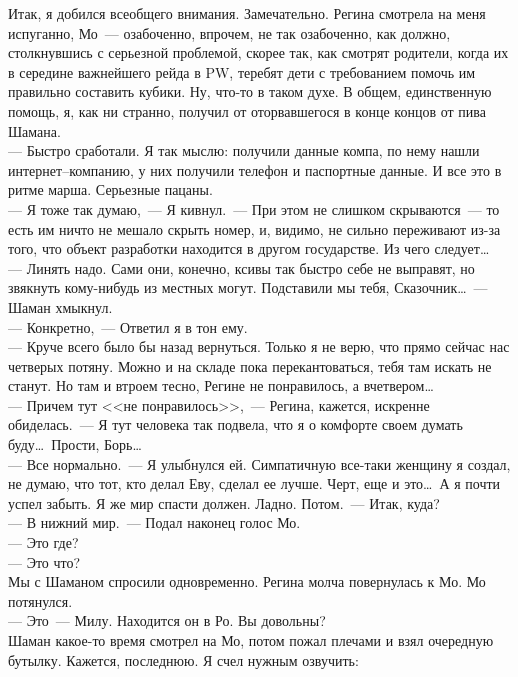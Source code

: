 Итак, я добился всеобщего внимания. Замечательно. Регина смотрела на меня 
испуганно, Мо~--- озабоченно, впрочем, не так озабоченно, как должно, 
столкнувшись с серьезной проблемой, скорее так, как смотрят родители, когда их в середине 
важнейшего рейда в PW, теребят дети с требованием помочь им правильно составить 
кубики. Ну, что-то в таком духе. В общем, единственную помощь, я, как ни 
странно, получил от оторвавшегося в конце концов от пива Шамана.\\
--- Быстро сработали. Я так мыслю: получили данные компа, по нему нашли 
интернет--компанию, у них получили телефон и паспортные данные. И все это в 
ритме марша. Серьезные пацаны. \\
--- Я тоже так думаю,~--- Я кивнул.~--- При этом не слишком скрываются~--- то 
есть им ничто не мешало скрыть номер, и, видимо, не сильно переживают из-за того, что 
объект разработки находится в другом государстве. Из чего следует\ldots\\
--- Линять надо. Сами они, конечно, ксивы так быстро себе не выправят, но 
звякнуть кому-нибудь из местных могут. Подставили мы тебя, Сказочник\ldots~--- Шаман хмыкнул.\\
--- Конкретно,~--- Ответил я в тон ему.\\
--- Круче всего было бы назад вернуться. Только я не верю, что прямо сейчас нас 
четверых потяну. Можно и на складе пока перекантоваться, тебя там искать не 
станут. Но там и втроем тесно, Регине не понравилось, а вчетвером\ldots\\
--- Причем тут <<не понравилось>>,~--- Регина, кажется, искренне обиделась.~--- Я 
тут человека так подвела, что я о комфорте своем думать буду\ldots\ Прости, 
Борь\ldots\\
--- Все нормально.~--- Я улыбнулся ей. Симпатичную все-таки женщину я создал, не 
думаю, что тот, кто делал Еву, сделал ее лучше. Черт, еще и это\ldots\ А я 
почти успел забыть. Я же мир спасти должен. Ладно. Потом.~--- Итак, куда?\\
--- В нижний мир.~--- Подал наконец голос Мо. \\
--- Это где?\\
--- Это что?\\
Мы с Шаманом спросили одновременно. Регина молча повернулась к Мо. Мо потянулся.\\
--- Это~--- Милу. Находится он в Ро. Вы довольны?\\
Шаман какое-то время смотрел на Мо, потом пожал плечами и взял очередную 
бутылку. Кажется, последнюю. Я счел нужным озвучить:\\
